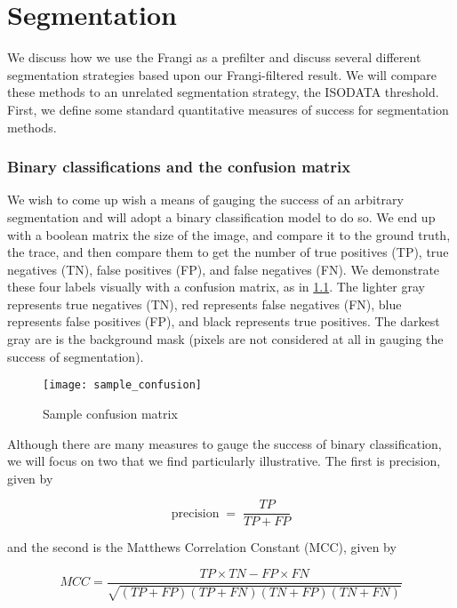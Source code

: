 \chapter{Segmentation} \label{ch:segmentation}

We discuss how we use the Frangi as a prefilter and discuss several different segmentation strategies based upon our Frangi-filtered result. We will compare these methods to an unrelated segmentation strategy, the ISODATA threshold. First, we define some standard quantitative measures of success for segmentation methods.


\subsection{Binary classifications and the confusion matrix}

We wish to come up wish a means of gauging the success of an arbitrary segmentation and will adopt a binary classification model to do so.
We end up with a boolean matrix the size of the image, and compare it to the ground truth, the trace, and then compare them to get the number of true positives (TP), true negatives (TN), false positives (FP), and false negatives (FN). We demonstrate these four labels visually with a confusion matrix, as in \cref{fig:sample-confusion}. The lighter gray represents true negatives (TN), red represents false negatives (FN), blue represents false positives (FP), and black represents true positives. The darkest gray are is the background mask (pixels are not considered at all in gauging the success of segmentation).
 
\begin{figure}
  \centering
  \texttt{[image: sample\_confusion]}
  \caption{Sample confusion matrix}
  \label{fig:sample-confusion}
\end{figure}

Although there are many measures to gauge the success of binary classification, we will focus on two that we find particularly illustrative. The first is precision, given by

\begin{equation}
\label{eq:precision}
\textrm{precision} \;=\; \frac{TP}{TP+FP}
\end{equation}

and the second is the Matthews Correlation Constant (MCC), given by

\begin{equation} \label{eq:MCC}
MCC = \frac{TP\times TN - FP \times FN}{\sqrt{ (TP + FP)(TP+FN)(TN+FP)(TN+FN)}}
\end{equation}

